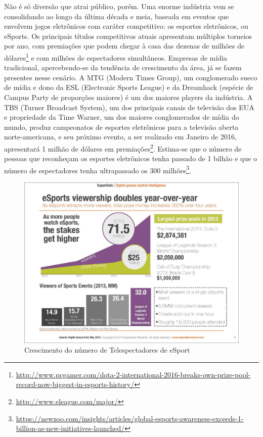 \documentclass[a4paper, 12pt]{paper}
\begin{document}
Não é só diversão que atrai público, porém. Uma enorme indústria vem se consolidando ao longo da última década e meia, baseada em eventos que envolvem jogos eletrônicos com caráter competitivo: os esportes eletrônicos, ou eSports. Os principais títulos competitivos atuais apresentam múltiplos torneios por ano, com premiações que podem chegar à casa das dezenas de milhões de dólares\footnote{\url{http://www.pcgamer.com/dota-2-international-2016-breaks-own-prize-pool-record-now-biggest-in-esports-history/}} e com milhões de espectadores simultâneos. Empresas de mídia tradicional, apercebendo-se da tendência de crescimento da área, já se fazem presentes nesse cenário. A MTG (Modern Times Group), um conglomerado sueco de mídia e dono da ESL (Electronic Sports League) e da Dreamhack (espécie de Campus Party de proporções maiores) é um dos maiores players da indústria. A TBS (Turner Broadcast System), um dos principais canais de televisão dos EUA e propriedade da Time Warner, um dos maiores conglomerados de mídia do mundo, produz campeonatos de esportes eletrônicos para a televisão aberta norte-americana, e seu próximo evento, a ser realizado em Janeiro de 2016, apresentará 1 milhão de dólares em premiações\footnote{\url{http://www.eleague.com/major/}}. Estima-se que o número de pessoas que reconheçam os esportes eletrônicos tenha passado de 1 bilhão e que o número de espectadores tenha ultrapassado os 300 milhões\footnote{\url{https://newzoo.com/insights/articles/global-esports-awareness-exceeds-1-billion-as-new-initiatives-launched/}}.

\begin{figure}[!ht]
	\centering
	\includegraphics[scale=0.45]{img/img01.png}
	\caption{Crescimento do número de Telespectadores de eSport}
\end{figure}
\end{document}

